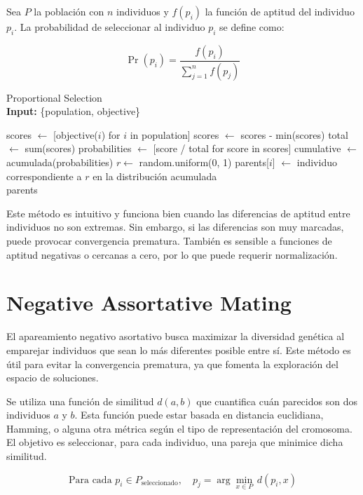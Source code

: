 Sea $P$ la población con $n$ individuos y $f(p_i)$ la función de aptitud del individuo $p_i$. La probabilidad de seleccionar al individuo $p_i$ se define como:

\[
\Pr(p_i) = \frac{f(p_i)}{\sum_{j=1}^{n} f(p_j)}
\]

\begin{algorithm}[H]
	\caption{Proportional Selection \\ \textbf{Input:} \{population, objective\}}
	\begin{algorithmic}[1]
		\State scores $\gets$ [objective($i$) for $i$ in population]
		\State scores $\gets$ scores - min(scores) 
		\EndIf
		\State total $\gets$ sum(scores)
		\State probabilities $\gets$ [score / total for score in scores]
		\State cumulative $\gets$ acumulada(probabilities)
		\State $r \gets$ random.uniform(0, 1)
		\State parents[$i$] $\gets$ individuo correspondiente a $r$ en la distribución acumulada
		\EndFor \\
		\Return parents
	\end{algorithmic}
	\label{alg:proportional_selection}
\end{algorithm}

Este método es intuitivo y funciona bien cuando las diferencias de aptitud entre individuos no son extremas. Sin embargo, si las diferencias son muy marcadas, puede provocar convergencia prematura. También es sensible a funciones de aptitud negativas o cercanas a cero, por lo que puede requerir normalización.


\section{Negative Assortative Mating}

El apareamiento negativo asortativo busca maximizar la diversidad genética al emparejar individuos que sean lo más diferentes posible entre sí. Este método es útil para evitar la convergencia prematura, ya que fomenta la exploración del espacio de soluciones.

Se utiliza una función de similitud $d(a, b)$ que cuantifica cuán parecidos son dos individuos $a$ y $b$. Esta función puede estar basada en distancia euclidiana, Hamming, o alguna otra métrica según el tipo de representación del cromosoma. El objetivo es seleccionar, para cada individuo, una pareja que minimice dicha similitud.

\[
\text{Para cada } p_i \in P_{\text{seleccionado}},\quad p_j = \arg\min_{x \in P} \, d(p_i, x)
\]

